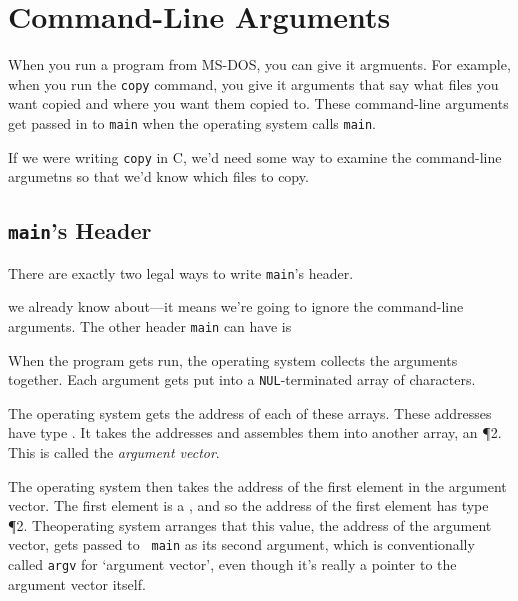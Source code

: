\section{Command-Line Arguments}

When you run a program from MS-DOS, you can give it argmuents.  For
example, when you run the {\tt copy} command, you  give it arguments
that say what files you want copied and where you want them copied to.
These command-line arguments get passed in to {\tt main} when the
operating system calls {\tt main}.

If we were writing {\tt copy} in C, we'd need some way to examine the
command-line argumetns so that we'd know which files to copy.

\subsection{{\tt main}'s Header}

There are exactly two legal ways to write {\tt main}'s header. 

\begin{flushleft}
\verb% int main(void)% \\*
\end{flushleft}

\noindent we already know about---it means we're going to ignore the
command-line arguments.  The other header {\tt main} can have is

\begin{flushleft}
\verb% int main(int argc, char **argv)% \\*
\end{flushleft}



When the program gets run, the operating system collects the arguments
together.  Each argument gets put into a {\tt NUL}-terminated array of
characters.

The operating system gets the address of each of these arrays.  These
addresses have type \Char.  It takes the addresses and assembles them
into another array, an \ao\P2\Char.  This is called the {\em argument
vector}\/.

The operating system then takes the address of the first element in the
argument vector.  The first element is a \Char, and so the address of
the first element has type \P2\Char.  Theoperating system arranges
that this value, the address of the argument vector, gets passed to {\tt
main} as its second argument, which is conventionally called {\tt argv}
for `argument vector', even though it's really a pointer to the argument
vector itself.

